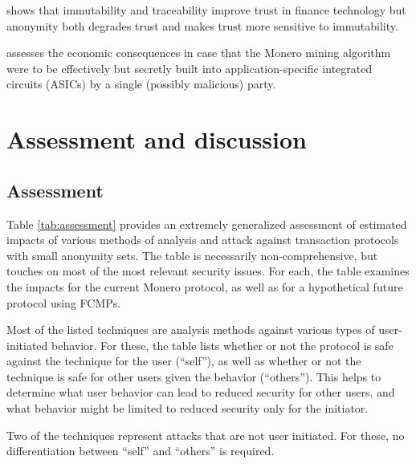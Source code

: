 \documentclass{article}
\theoremstyle{definition}
\begin{document}
\cite{wallbach2020trust} shows that immutability and traceability improve trust in finance technology but anonymity both degrades trust and makes trust more sensitive to immutability.

\cite{purkovic2021empirical} assesses the economic consequences in case that the Monero mining algorithm were to be effectively but secretly built into application-specific integrated circuits (ASICs) by a single (possibly malicious) party.


\section{Assessment and discussion}


\subsection{Assessment}

Table \ref{tab:assessment} provides an extremely generalized assessment of estimated impacts of various methods of analysis and attack against transaction protocols with small anonymity sets.
The table is necessarily non-comprehensive, but touches on most of the most relevant security issues.
For each, the table examines the impacts for the current Monero protocol, as well as for a hypothetical future protocol using FCMPs.

Most of the listed techniques are analysis methods against various types of user-initiated behavior.
For these, the table lists whether or not the protocol is safe against the technique for the user (``self''), as well as whether or not the technique is safe for other users given the behavior (``others'').
This helps to determine what user behavior can lead to reduced security for other users, and what behavior might be limited to reduced security only for the initiator.

Two of the techniques represent attacks that are not user initiated.
For these, no differentiation between ``self'' and ``others'' is required.
\end{document}

